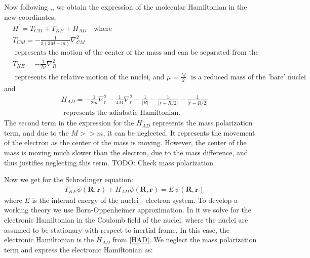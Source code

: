 Now following \cite{ZygelmanDalgarno1},\cite{Greg}, we obtain the expression of the molecular Hamiltonian in the new coordinates,
\begin{equation}
\begin{split}
& H^{'} = T_{CM} + T_{KE} + H_{AD} \,\,\,\,\text{ where } \\[.8em]
& T_{CM} = -\frac{1}{2(2M +m)}\nabla_{CM}^{2} \\[.8em]
& \text{ represents the motion of the center of the mass and can be separated from the total energy of the nuclei. } \\[.8em]
& T_{KE} = -\frac{1}{2\mu}\nabla_R^2 \\[.8em]
& \text{ represents the relative motion of the nuclei, and } \mu = \frac{M}{2}\,\,\text{ is a reduced mass of the 'bare' nuclei}
\end{split}
\end{equation}
and
\begin{equation}\label{HAD}
\begin{split}
& H_{AD} = -\frac{1}{2m}\nabla_r^2 - \frac{1}{4M}\nabla_r^2 + \frac{1}{\left|R\right|} - \frac{1}{\left|r + R/2\right|} - \frac{1}{\left|r - R/2\right|} \\[.8em]
& \text{ represents the adiabatic Hamiltonian.  }
\end{split}
\end{equation}
The second term in the expression for the $ H_{AD} $ represents the mass polarization term, and due to the $ M >> m $, it can be neglected. It represents the movement of the electron as the center of the mass is moving. However, the center of the mass is moving much slower than the electron, due to the mass difference, and thus justifies neglecting this term.
TODO: Check mass polarization

Now we get for the Schrodinger equation:
\begin{equation}
\begin{split}
& T_{KE}\psi(\mathbf{R},\mathbf{r}) + H_{AD}\psi(\mathbf{R},\mathbf{r}) = E \, \psi(\mathbf{R},\mathbf{r})
\end{split}
\end{equation}
where $ E $ is the internal energy of the nuclei - electron system. To develop a working theory we use Born-Oppenheimer approximation. In it we solve for the electronic Hamiltonian in the Coulomb field of the nuclei, where the nuclei are assumed to be stationary with respect to inertial frame. In this case, the electronic Hamiltonian is the $ H_{AD} $ from \eqref{HAD}. We neglect the mass polarization term and express the electronic Hamiltonian as:

